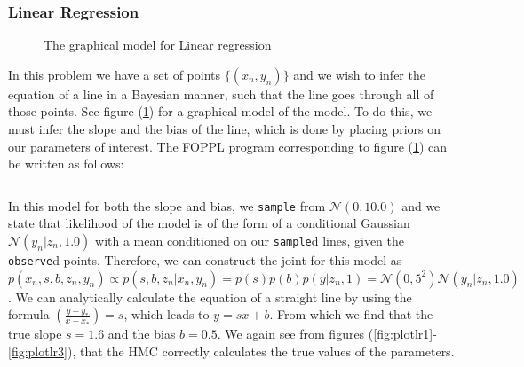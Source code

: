 \documentclass[twoside]{article}
\begin{document}
\subsubsection{Linear Regression}
\begin{figure}[ht]
	\begin{center}
		
	\end{center}
	\caption{The graphical model for Linear regression}
    \label{fig:lrgraph}
\end{figure}
In this problem we have a set of points $\{(x_{n},y_{n})\}$ and we wish to infer the equation of a line in a Bayesian manner, such that the line goes through all of those points. See figure (\ref{fig:lrgraph}) for a graphical model of the model. To do this, we must infer the slope and the bias of the line, which is done by placing priors on our parameters of interest. The FOPPL program corresponding to figure (\ref{fig:lrgraph}) can be written as follows:\inputminted{clojure}{code/linearregression.clj}In this model for both the slope and bias, we \texttt{sample} from $\mathcal{N}(0,10.0)$ and we state that likelihood of the model is of the form of a conditional Gaussian $\mathcal{N}(y_{n}| z_{n}, 1.0)$ with a mean conditioned on our \texttt{sample}d lines, given the \texttt{observe}d points. Therefore, we can construct the joint for this model as $p(x_{n},s,b,z_{n}, y_{n}) \propto p(s,b,z_{n} | x_{n}, y_{n}) = p(s)p(b)p(y | z_{n}, 1) =\mathcal{N}(0,5^{2})\mathcal{N}(y_{n}|z_{n},1.0)$. We can analytically calculate the equation of a straight line by using the formula $\left(\frac{y - y_{*}}{x - x_{*}}\right) = s$, which leads to $y = sx + b$. From which we find that the true slope $s = 1.6$ and the bias $b = 0.5$. We again see from figures (\ref{fig:plotlr1}-\ref{fig:plotlr3}), that the HMC correctly calculates the true values of the parameters.\\
\end{document}
